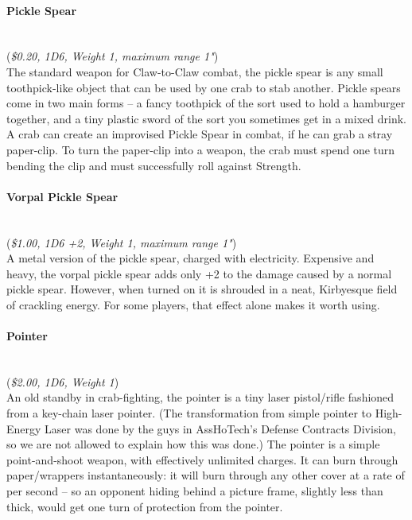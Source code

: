 \documentclass[a4paper,10pt]{article}
\newcommand{\inch}{\textacutedbl\hspace*{4pt}}
\begin{document}
\paragraph*{Pickle Spear}
\label{sec:PickleSpear}
\hspace*{0px}\\(\textit{\$0.20, 1D6, Weight 1, maximum range 1"})\\
The standard weapon for Claw-to-Claw combat, the pickle spear is any small toothpick-like object that can be used by one crab to stab another. Pickle spears come in two main forms -- a fancy toothpick of the sort used to hold a hamburger together, and a tiny plastic sword of the sort you sometimes get in a mixed drink. A crab can create an improvised Pickle Spear in combat, if he can grab a stray paper-clip. To turn the paper-clip into a weapon, the crab must spend one turn bending the clip and must successfully roll against Strength.

\paragraph*{Vorpal Pickle Spear}
\label{sec:VorpalPickleSpear}
\hspace*{0px}\\(\textit{\$1.00, 1D6 +2, Weight 1, maximum range 1"})\\
A metal version of the pickle spear, charged with electricity. Expensive and heavy, the vorpal pickle spear adds only +2 to the damage caused by a normal pickle spear. However, when turned on it is shrouded in a neat, Kirbyesque field of crackling energy. For some players, that effect alone makes it worth using.

\paragraph*{Pointer}
\label{sec:Pointer}
\hspace*{0px}\\(\textit{\$2.00, 1D6, Weight 1})\\
An old standby in crab-fighting, the pointer is a tiny laser pistol/rifle fashioned from a key-chain laser pointer. (The transformation from simple pointer to High-Energy Laser was done by the guys in AssHoTech's Defense Contracts Division, so we are not allowed to explain how this was done.) The pointer is a simple point-and-shoot weapon, with effectively unlimited charges. It can burn through paper/wrappers instantaneously: it will burn through any other cover at a rate of \textonequarter\inch per second -- so an opponent hiding behind a picture frame, slightly less than \textonequarter\inch thick, would get one turn of protection from the pointer.
\end{document}
